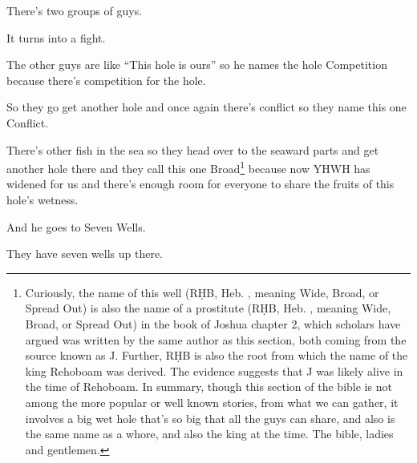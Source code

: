 {
}
{
}
{
	There's two groups of guys.
	
	It turns into a fight.

	The other guys are like ``This hole is ours'' so he names the
	hole Competition because there's competition for the hole.
}

{
}
{
}
{
	So they go get another hole and once again there's conflict so they name
	this one Conflict.
}

{
}
{
}
{
	There's other fish in the sea so they head over to the seaward parts and
	get another hole there and they call this one Broad\footnote{
		Curiously, the name of this well
		(RḤB, Heb. , meaning Wide, Broad, or Spread Out)
		is also the name of a prostitute
		(RḤB, Heb. , meaning Wide, Broad, or Spread Out)
		in the book of Joshua chapter 2, which scholars have argued
		was written by the same author as this section, both coming
		from the source known as J. Further, RḤB is also the root
		from which the name of the king Rehoboam was derived.
		The evidence suggests that J was likely alive in the time
		of Rehoboam. In summary, though this section of the bible
		is not among the more popular or well known stories, from
		what we can gather, it involves a big wet hole that's so big
		that all the guys can share, and also is the same name as
		a whore, and also the king at the time. The bible, ladies
		and gentlemen.
	} because now YHWH has
	widened for us and there's enough room for everyone to share the fruits of
	this hole's wetness.
}

{
}
{
}
{
	And he goes to Seven Wells.

	They have seven wells up there.
}

